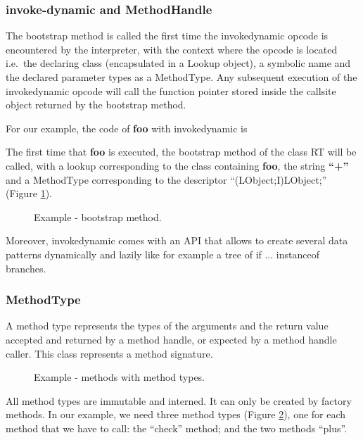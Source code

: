 \documentclass{sig-alternate}
\begin{document}
    \subsubsection{invoke-dynamic and MethodHandle}

      The bootstrap method is called the first time the invokedynamic opcode is encountered by the interpreter,
      with the context where the opcode is located i.e.~the declaring class (encapsulated in a Lookup object),
      a symbolic name and the declared parameter types as a MethodType.
      Any subsequent execution of the invokedynamic opcode will call the function pointer
      stored inside the callsite object returned by the bootstrap method.
      
      For our example, the code of {\bf foo} with invokedynamic is

      

      The first time that {\bf foo} is executed, the bootstrap method of the class RT will be called, with a lookup corresponding to the class containing {\bf foo},
      the string {\bf ``+''} and a MethodType corresponding to the descriptor ``(LObject;I)LObject;'' (Figure \ref{fooBSM}).

      \begin{figure}[!h]
        \centering 
        \caption{Example - bootstrap method.}
        \label{fooBSM}
      \end{figure}

      Moreover, invokedynamic comes with an API that allows to create several data patterns
      dynamically and lazily like for example a tree of if ... instanceof branches.

    \subsubsection{MethodType}

      A method type represents the types of the arguments and the return value accepted and returned by a method handle,
      or expected by a method handle caller.
      This class represents a method signature.

      \begin{figure}[!h]
        \centering 
        \caption{Example - methods with method types.}
        \label{fooMTS}
      \end{figure}

      All method types are immutable and interned.
      It can only be created by factory methods.
      In our example, we need three method types (Figure \ref{fooMTS}), one for each method that we have to call:
      the ``check'' method; and the two methods ``plus''.
\end{document}
